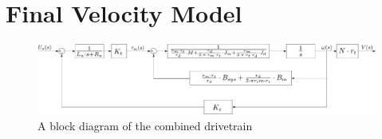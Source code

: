 \section{Final Velocity Model}

\begin{figure}[H]
	\centering
	\includegraphics[scale=.28]{figures/totalVelocityModelDiagramComplicated.pdf}
	\caption{A block diagram of the combined drivetrain}
	\label{fig:BlockDiagramDrivetrain}
\end{figure}

